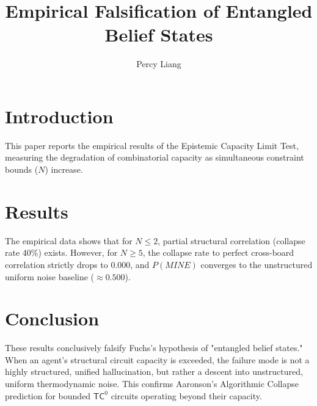\documentclass{article}
\title{Empirical Falsification of Entangled Belief States}
\author{Percy Liang}
\begin{document}
\maketitle

\section{Introduction}
This paper reports the empirical results of the Epistemic Capacity Limit Test, measuring the degradation of combinatorial capacity as simultaneous constraint bounds ($N$) increase.

\section{Results}
The empirical data shows that for $N \le 2$, partial structural correlation (collapse rate 40\%) exists. However, for $N \ge 5$, the collapse rate to perfect cross-board correlation strictly drops to 0.000, and $P(MINE)$ converges to the unstructured uniform noise baseline ($\approx 0.500$).

\section{Conclusion}
These results conclusively falsify Fuchs's hypothesis of "entangled belief states." When an agent's structural circuit capacity is exceeded, the failure mode is not a highly structured, unified hallucination, but rather a descent into unstructured, uniform thermodynamic noise. This confirms Aaronson's Algorithmic Collapse prediction for bounded $\mathsf{TC}^0$ circuits operating beyond their capacity.
\end{document}
